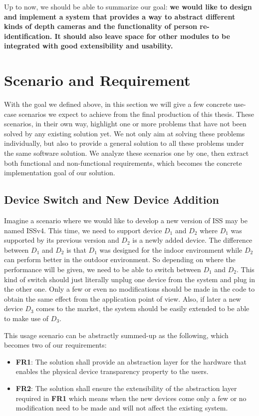 Up to now, we should be able to summarize our goal:
\textbf{
    we would like to design and implement a system that provides a way to
	abstract different kinds of depth cameras and the functionality of person
	re-identification. It should also leave space for other modules to be
	integrated with good extensibility and usability.
}

\section{Scenario and Requirement}
\label{sec:intro-scen-req}

With the goal we defined above, in this section we will give a few concrete
use-case scenarios we expect to achieve from the final production of this thesis.
These scenarios, in their own way, highlight one or more problems that have not
been solved by any existing solution yet. We not only aim at solving these problems
individually, but also to provide a general solution to all these problems
under the same software solution.
We analyze these scenarios one by one, then extract both functional and
non-functional requirements, which becomes the concrete implementation goal of
our solution.

\subsection{Device Switch and New Device Addition}
\label{sec:intro-sq-dev}

Imagine a scenario where we would like to develop a new version of ISS
may be named ISSv4. This time, we need to support device $D_1$ and $D_2$ where
$D_1$ was supported by its previous version and $D_2$ is a newly added device.
The difference between $D_1$ and $D_2$ is that $D_1$ was designed for the indoor
environment while $D_2$ can perform better in the outdoor environment. So depending on
where the performance will be given, we need to be able to switch between $D_1$
and $D_2$. This kind of switch should just literally unplug one device from
the system and plug in the other one. Only a few or even no modifications should
be made in the code to obtain the same effect from the application point of
view. Also, if later a new device $D_3$ comes to the market, the system
should be easily extended to be able to make use of $D_3$.

This usage scenario can be abstractly summed-up as the following, which becomes
two of our requirements:

\begin{itemize}
    \item \textbf{FR1}: The solution shall provide an abstraction layer for the
    hardware that enables the physical device transparency property to
    the users.
    \item \textbf{FR2}: The solution shall ensure the extensibility of the
    abstraction layer required in \textbf{FR1} which means when the new devices
    come only a few or no modification need to be made and will not affect the
    existing system.
\end{itemize}

